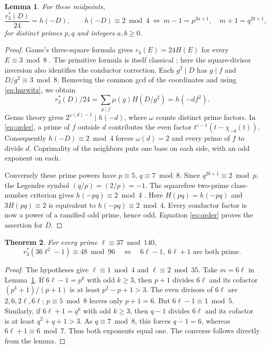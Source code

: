 \documentclass[11pt]{article}
\newtheorem{theorem}{Theorem}
\newtheorem{lemma}[theorem]{Lemma}
\begin{document}
\begin{lemma}\label{lem:primitive}
For these midpoints,
\[
 \frac{r_3^*(D)}{24}=h(-D),\qquad
 h(-D)\equiv2\bmod4
 \ \Longleftrightarrow\
 m-1=p^{2a+1},\quad m+1=q^{2b+1},
\]
for distinct primes $p,q$ and integers $a,b\ge0$.
\end{lemma}
\begin{proof}
Gauss's three-square formula gives $r_3(E)=24H(E)$ for every
$E\equiv3\bmod8$ \cite[Theorem 1.4]{mortenson}. The primitive
formula is itself classical \cite[Theorem 1.3]{mortenson}; here the
square-divisor inversion also identifies the conductor correction.
Each $g^2\mid D$
has $g\mid f$ and $D/g^2\equiv3\bmod8$. Removing the common gcd of
the coordinates and using \eqref{eq:hurwitz}, we obtain
\[
 r_3^*(D)/24=\sum_{g\mid f}\mu(g)H(D/g^2)=h(-df^2).
\]
Genus theory gives $2^{\omega(d)-1}\mid h(-d)$, where $\omega$ counts
distinct prime factors. In \eqref{eq:order}, a prime of $f$ outside
$d$ contributes the even factor $t^{e-1}(t-\chi_{-d}(t))$.
Consequently $h(-D)\equiv2\bmod4$ forces $\omega(d)=2$ and
every prime of $f$ to divide $d$. Coprimality of the neighbors
puts one base on each side, with an odd exponent on each.

Conversely these prime powers have $p\equiv5$, $q\equiv7\bmod8$.
Since $q^{2b+1}\equiv2\bmod p$, the Legendre symbol
$(q/p)=(2/p)=-1$. The squarefree two-prime class-number
criterion gives $h(-pq)\equiv2\bmod4$
\cite[Theorem 2.3(2), including its attribution to Hasse]{chen}.
Here $H(pq)=h(-pq)$ and $3H(pq)\equiv2$ is equivalent to
$h(-pq)\equiv2\bmod4$. Every conductor factor is now a power of a
ramified odd prime, hence odd. Equation \eqref{eq:order} proves
the assertion for $D$.
\end{proof}

\begin{theorem}\label{th:three}
For every prime $\ell\equiv37\bmod140$,
\[
       r_3^*(36\ell^2-1)\equiv48\bmod96
       \quad\Longleftrightarrow\quad
       6\ell-1,\;6\ell+1\text{ are both prime}.
\]
\end{theorem}
\begin{proof}
The hypotheses give $\ell\equiv1\bmod4$ and $\ell\equiv2\bmod35$.
Take $m=6\ell$ in Lemma~\ref{lem:primitive}. If $6\ell-1=p^k$
with odd $k\ge3$, then $p+1$ divides $6\ell$ and its cofactor
$(p^k+1)/(p+1)$ is at least $p^2-p+1>3$. The even divisors of
$6\ell$ are $2,6,2\ell,6\ell$; $p\equiv5\bmod8$ leaves only
$p+1=6$. But $6\ell-1\equiv1\bmod5$. Similarly, if $6\ell+1=q^k$
with odd $k\ge3$, then $q-1$ divides $6\ell$ and its cofactor
is at least $q^2+q+1>3$. As $q\equiv7\bmod8$, this forces
$q-1=6$, whereas $6\ell+1\equiv6\bmod7$. Thus both exponents
equal one. The converse follows directly from the lemma.
\end{proof}
\end{document}
